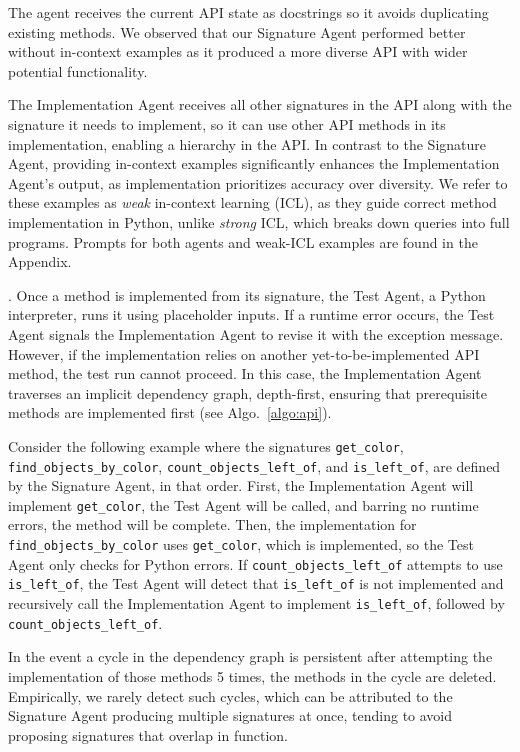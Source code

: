 The agent receives the current API state as docstrings so it avoids duplicating existing methods. We observed that our Signature Agent performed better without in-context examples as it produced a more diverse API with wider potential functionality. 

The Implementation Agent receives all other signatures in the API along with the signature it needs to implement, so it can use other API methods in its implementation, enabling a hierarchy in the API. In contrast to the Signature Agent, providing in-context examples significantly enhances the Implementation Agent’s output, as implementation prioritizes accuracy over diversity. We refer to these examples as \emph{weak} in-context learning (ICL), as they guide correct method implementation in Python, unlike \emph{strong} ICL, which breaks down queries into full programs. Prompts for both agents and weak-ICL examples are found in the Appendix. 

.
Once a method is implemented from its signature, the Test Agent, a Python interpreter, runs it using placeholder inputs. If a runtime error occurs, the Test Agent signals the Implementation Agent to revise it with the exception message. However, if the implementation relies on another yet-to-be-implemented API method, the test run cannot proceed. In this case, the Implementation Agent traverses an implicit dependency graph, depth-first, ensuring that prerequisite methods are implemented first (see Algo.~\ref{algo:api}).

Consider the following example where the signatures \texttt{get\_color}, \texttt{find\_objects\_by\_color}, \texttt{count\_objects\_left\_of}, and \texttt{is\_left\_of}, are defined by the Signature Agent, in that order. First, the Implementation Agent will implement \texttt{get\_color}, the Test Agent will be called, and barring  no runtime errors, the method will be complete. Then, the implementation for \texttt{find\_objects\_by\_color} uses \texttt{get\_color}, which is implemented, so the Test Agent only checks for Python errors. If \texttt{count\_objects\_left\_of} attempts to use \texttt{is\_left\_of}, the Test Agent will detect that \texttt{is\_left\_of} is not implemented and recursively call the Implementation Agent to implement \texttt{is\_left\_of}, followed by \texttt{count\_objects\_left\_of}.

In the event a cycle in the dependency graph is persistent after attempting the implementation of those methods 5 times, the methods in the cycle are deleted. Empirically, we rarely detect such cycles, which can be attributed to the Signature Agent producing multiple signatures at once, tending to avoid proposing signatures that overlap in function.

